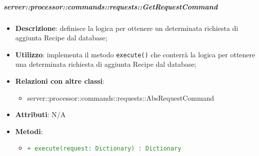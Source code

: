         \subparagraph{server::processor::commands::requests::GetRequestCommand} %
        \label{subp:bdsm_app_server_processor_commands_requests_getrequestcommand}
        \begin{itemize}
          \item \textbf{Descrizione}: definisce la logica per ottenere un determinata richiesta di aggiunta Recipe dal database;
          \item \textbf{Utilizzo}: implementa il metodo \texttt{execute()} che conterrà la logica per ottenere una determinata richiesta di aggiunta Recipe dal database;
          \item \textbf{Relazioni con altre classi}:
            \begin{itemize}
              \item server::processor::commands::requests::AbsRequestCommand
            \end{itemize}
          \item \textbf{Attributi}: N/A
          \item \textbf{Metodi}:
          \begin{itemize}
              \item \textcolor{forestgreen}{\texttt{+ execute(request: Dictionary) : Dictionary}}
          \end{itemize}
        \end{itemize}

